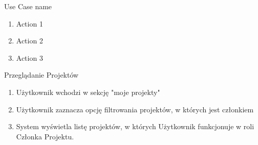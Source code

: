 \begin{usecase}{Use Case name}
	\begin{enumerate}
		\item Action 1
		\item Action 2
		\item Action 3
	\end{enumerate}
	\beginalternatives
	\precond{\todo}
	\postcond{\todo}
\end{usecase}

\begin{usecase}{Przeglądanie Projektów}
\label{przegladanie_projektow}
	\begin{enumerate}
      \item Użytkownik wchodzi w sekcję "moje projekty"
      \item Użytkownik zaznacza opcję filtrowania projektów, w których jest członkiem
      \item System wyświetla listę projektów, w których Użytkownik funkcjonuje w roli Członka Projektu.
	\end{enumerate}
\end{usecase}

